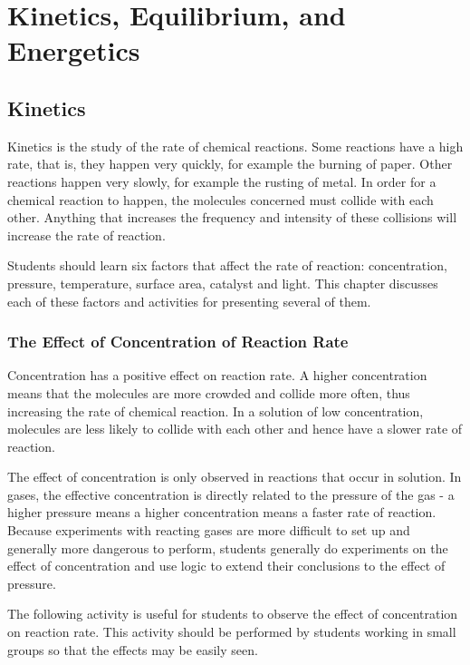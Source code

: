 \chapter{Kinetics, Equilibrium, and Energetics}

\section{Kinetics}

Kinetics is the study of the rate of chemical reactions. Some reactions have a high rate, that is, they happen very quickly, for example the burning of paper. Other reactions happen very slowly, for example the rusting of metal. In order for a chemical reaction to happen, the molecules concerned must collide with each other. Anything that increases the frequency and intensity of these collisions will increase the rate of reaction.

Students should learn six factors that affect the rate of reaction: concentration, pressure, temperature, surface area, catalyst and light. This chapter discusses each of these factors and activities for presenting several of them.

\subsection{The Effect of Concentration of Reaction Rate}

Concentration has a positive effect on reaction rate. A higher concentration means that the molecules are more crowded and collide more often, thus increasing the rate of chemical reaction. In a solution of low concentration, molecules are less likely to collide with each other and hence have a slower rate of reaction. 

The effect of concentration is only observed in reactions that occur in solution. In gases, the effective concentration is directly related to the pressure of the gas - a higher pressure means a higher concentration means a faster rate of reaction. Because experiments with reacting gases are more difficult to set up and generally more dangerous to perform, students generally do experiments on the effect of concentration and use logic to extend their conclusions to the effect of pressure.

The following activity is useful for students to observe the effect of concentration on reaction rate. This activity should be performed by students working in small groups so that the effects may be easily seen.

